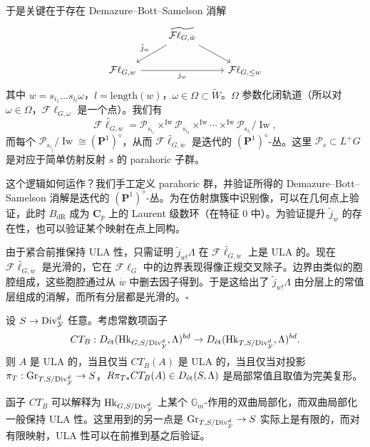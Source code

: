 于是关键在于存在 Demazure--Bott--Samelson 消解
\[
\begin{tikzcd}
& \widetilde{\mathcal{F}\ell_{G,\dot w}} \arrow[dl,"\tilde j_w"'] \arrow[dr] \\
\mathcal{F}\ell_{G,w} \arrow[rr,"j_w"'] && \mathcal{F}\ell_{G,\le w}
\end{tikzcd}
\]
其中 $w=s_{i_1}\ldots s_{i_l}\omega$，$l=\mathrm{length}(w)$，$\omega\in\Omega\subset\widetilde W$。$\Omega$ 参数化闭轨道（所以对 $\omega\in\Omega$，$\mathcal{F}\ell_{G,\omega}$ 是一个点）。我们有
\[
\widetilde{\mathcal{F}\ell_{G,\dot w}}=\mathcal{P}_{s_{i_1}}\times^{\operatorname{Iw}}\mathcal{P}_{s_{i_2}}\times^{\operatorname{Iw}}\cdots\times^{\operatorname{Iw}}\mathcal{P}_{s_{i_l}}/\operatorname{Iw},
\]
而每个 $\mathcal{P}_{s_{i_j}}/\operatorname{Iw}\cong(\mathbf{P}^1)^\diamond$，从而 $\widetilde{\mathcal{F}\ell_{G,\dot w}}$ 是迭代的 $(\mathbf{P}^1)^\diamond$-丛。这里 $\mathcal{P}_s\subset L^+G$ 是对应于简单仿射反射 $s$ 的 parahoric 子群。

这个逻辑如何运作？我们手工定义 parahoric 群，并验证所得的 Demazure--Bott--Samelson 消解是迭代的 $(\mathbf{P}^1)^\diamond$-丛。为在仿射旗簇中识别像，可以在几何点上验证，此时 $B_{\mathrm{dR}}$ 成为 $\mathbf{C}_p$ 上的 Laurent 级数环（在特征 $0$ 中）。为验证提升 $\tilde j_w$ 的存在性，也可以验证某个映射在点上同构。

由于紧合前推保持 ULA 性，只需证明 $\tilde j_{w!}\Lambda$ 在 $\widetilde{\mathcal{F}\ell_{G,\dot w}}$ 上是 ULA 的。现在 $\widetilde{\mathcal{F}\ell_{G,\dot w}}$ 是光滑的，它在 $\mathcal{F}\ell_G$ 中的边界表现得像正规交叉除子。边界由类似的胞腔组成，这些胞腔通过从 $\dot w$ 中删去因子得到。于是这给出了 $\tilde j_{w!}\Lambda$ 由分层上的常值层组成的消解，而所有分层都是光滑的。\hfill$\square$

\begin{proposition}
设 $S\to\Div^d_{\cY}$ 任意。考虑常数项函子
\[
CT_B:D_{\et}(\mathrm{Hk}_{G,S/\Div^d_{\cY}},\Lambda)^{bd}\to D_{\et}(\mathrm{Hk}_{T,S/\Div^d_{\cY}},\Lambda)^{bd}.
\]
则 $A$ 是 ULA 的，当且仅当 $CT_B(A)$ 是 ULA 的，当且仅当对投影 $\pi_T:\Gr_{T,S/\Div^d_{\cY}}\to S$，$R\pi_{T*}CT_B(A)\in D_{\et}(S,\Lambda)$ 是局部常值且取值为完美复形。
\end{proposition}

\begin{remark}
函子 $CT_B$ 可以解释为 $\mathrm{Hk}_{G,S/\Div^d_{\cY}}$ 上某个 $\mathbb{G}_m$-作用的双曲局部化，而双曲局部化一般保持 ULA 性。这里用到的另一点是 $\Gr_{T,S/\Div^d_{\cY}}\to S$ 实际上是有限的，而对有限映射，ULA 性可以在前推到基之后验证。
\end{remark}


